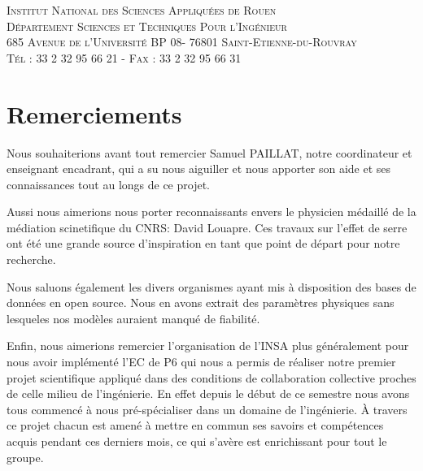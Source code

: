 \documentclass[a4paper, 12pt]{report} %
\begin{document}

\begin{center}
	\scshape Institut National des Sciences Appliquées de Rouen \\
	Département Sciences et Techniques Pour l'Ingénieur \\
	685 Avenue de l'Université BP 08- 76801 Saint-Etienne-du-Rouvray \\ Tél : 33 2 32 95 66 21 - Fax : 33 2 32 95 66 31
\end{center}


\newpage
\chapter*{Remerciements} %

\setlength{\parindent}{30pt}
Nous souhaiterions avant tout remercier Samuel PAILLAT, notre
coordinateur et enseignant encadrant, qui a su nous aiguiller
et nous apporter son aide et ses connaissances tout au longs
de ce projet. \vspace{\baselineskip}

\indent Aussi nous aimerions nous porter reconnaissants 
envers le physicien médaillé de la médiation scinetifique
du CNRS: David Louapre. Ces travaux sur l'effet de serre 
ont été une grande source d'inspiration en tant que point
de départ pour notre recherche. \vspace{\baselineskip}

\indent Nous saluons également les divers organismes ayant 
mis à disposition des bases de données en open source. Nous
en avons extrait des paramètres physiques sans lesqueles 
nos modèles auraient manqué de fiabilité. \vspace{\baselineskip}

\indent Enfin, nous aimerions remercier l'organisation de 
l'INSA plus généralement pour nous avoir implémenté l'EC de P6
qui nous a permis de réaliser notre premier projet
scientifique appliqué dans des conditions de collaboration
collective proches de celle milieu de l'ingénierie. 
En effet depuis le début de ce semestre nous avons tous commencé à 
nous pré-spécialiser dans un domaine de l'ingénierie. À travers 
ce projet chacun est amené à mettre en commun ses savoirs et 
compétences acquis pendant ces derniers mois, ce qui s'avère est 
enrichissant pour tout le groupe.
\end{document}
